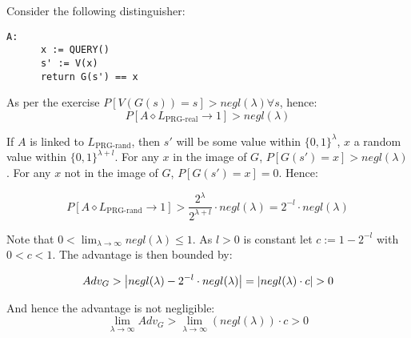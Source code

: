 \documentclass[a4paper]{scrreprt}
\DeclarePairedDelimiter\abs{\lvert}{\rvert}
\begin{document}
Consider the following distinguisher:

\begin{lstlisting}[mathescape=true, frame=single]
	A:
	  x := QUERY()
	  s' := V(x)
	  return G(s') == x
\end{lstlisting}

As per the exercise $P[V(G(s)) = s] > negl(\lambda) \forall s$, hence:
\[
	P[A \diamond L_{\text{PRG-real}} \rightarrow 1] > negl(\lambda)
\]

If $A$ is linked to $L_{\text{PRG-rand}}$, then $s'$ will be some value within
$\{0, 1\}^\lambda$, $x$ a random value within $\{0, 1\}^{\lambda + l}$. For any
$x$ in the image of $G$, $P[G(s') = x] > negl(\lambda)$. For any $x$ not in the
image of $G$, $P[G(s') = x] = 0$. Hence:

\[
	P[A \diamond L_{\text{PRG-rand}} \rightarrow 1] > \frac{2^\lambda}{2^{\lambda + l}} \cdot negl(\lambda) = 2^{-l} \cdot negl(\lambda)
\]

Note that $0 < \lim_{\lambda \rightarrow \infty} negl(\lambda) \leq 1$. As $l >
0$ is constant let $c := 1 - 2^{-l}$ with $0 < c < 1$. The advantage is then
bounded by:

\[
	Adv_G > \abs*{negl(\lambda) - 2^{-l} \cdot negl(\lambda)} = \abs*{negl(\lambda) \cdot c} > 0
\]

And hence the advantage is not negligible:
\[
	\lim_{\lambda \to \infty} Adv_G > \lim_{\lambda \to \infty}(negl(\lambda)) \cdot c > 0
\]
\end{document}

